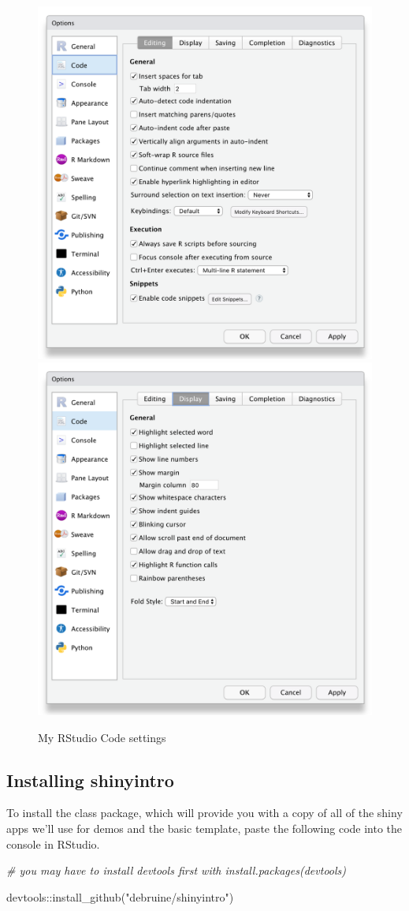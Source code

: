 \documentclass[
  oneside]{book}
\newenvironment{Shaded}{\begin{snugshade}}{\end{snugshade}}
\newcommand{\CommentTok}[1]{\textcolor[rgb]{0.56,0.35,0.01}{\textit{#1}}}
\newcommand{\FunctionTok}[1]{\textcolor[rgb]{0.00,0.00,0.00}{#1}}
\newcommand{\NormalTok}[1]{#1}
\newcommand{\SpecialCharTok}[1]{\textcolor[rgb]{0.00,0.00,0.00}{#1}}
\newcommand{\StringTok}[1]{\textcolor[rgb]{0.31,0.60,0.02}{#1}}
\begin{document}
\begin{figure}

{\centering \includegraphics[width=0.45\linewidth]{images/rstudio_settings_code_editing} \includegraphics[width=0.45\linewidth]{images/rstudio_settings_code_display} 

}

\caption{My RStudio Code settings}\label{fig:settings-code}
\end{figure}

\hypertarget{installing-shinyintro-1}{%
\subsection{Installing shinyintro}\label{installing-shinyintro-1}}

To install the class package, which will provide you with a copy of all of the shiny apps we'll use for demos and the basic template, paste the following code into the console in RStudio.

\begin{Shaded}
\begin{Highlighting}[]
\CommentTok{\# you may have to install devtools first with install.packages(\textquotesingle{}devtools\textquotesingle{})}

\NormalTok{devtools}\SpecialCharTok{::}\FunctionTok{install\_github}\NormalTok{(}\StringTok{"debruine/shinyintro"}\NormalTok{)}
\end{Highlighting}
\end{Shaded}
\end{document}
